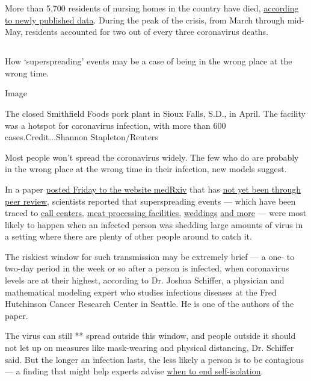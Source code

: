 More than 5,700 residents of nursing homes in the country have died,
\href{https://www.medrxiv.org/content/10.1101/2020.06.20.20136234v1.full.pdf}{according
to newly published data}. During the peak of the crisis, from March
through mid-May, residents accounted for two out of every three
coronavirus deaths.

\hypertarget{section-9}{%
\subsection{}\label{section-9}}

How `superspreading' events may be a case of being in the wrong place at
the wrong time.

Image

The closed Smithfield Foods pork plant in Sioux Falls, S.D., in April.
The facility was a hotspot for coronavirus infection, with more than 600
cases.Credit...Shannon Stapleton/Reuters

Most people won't spread the coronavirus widely. The few who do are
probably in the wrong place at the wrong time in their infection, new
models suggest.

In a paper
\href{https://www.medrxiv.org/content/10.1101/2020.08.07.20169920v1.full.pdf}{posted
Friday to the website medRxiv} that has
\href{https://www.nytimes.com/2020/04/14/science/coronavirus-disinformation.html}{not
yet been through peer review}, scientists reported that superspreading
events --- which have been traced to
\href{https://wwwnc.cdc.gov/eid/article/26/8/20-1274_article}{call
centers},
\href{https://www.nytimes.com/2020/04/15/us/coronavirus-south-dakota-meat-plant-refugees.html}{meat
processing facilities},
\href{https://wwwnc.cdc.gov/eid/article/26/9/20-1469_article?deliveryName=USCDC_333-DM28908}{weddings}
\href{https://www.nytimes.com/2020/03/30/us/coronavirus-funeral-albany-georgia.html}{and
more} --- were most likely to happen when an infected person was
shedding large amounts of virus in a setting where there are plenty of
other people around to catch it.

The riskiest window for such transmission may be extremely brief --- a
one- to two-day period in the week or so after a person is infected,
when coronavirus levels are at their highest, according to Dr. Joshua
Schiffer, a physician and mathematical modeling expert who studies
infectious diseases at the Fred Hutchinson Cancer Research Center in
Seattle. He is one of the authors of the paper.

The virus can still ** spread outside this window, and people outside it
should not let up on measures like mask-wearing and physical distancing,
Dr. Schiffer said. But the longer an infection lasts, the less likely a
person is to be contagious --- a finding that might help experts advise
\href{https://www.nytimes.com/2020/07/22/health/coronavirus-isolation-testing.html}{when
to end self-isolation}.

